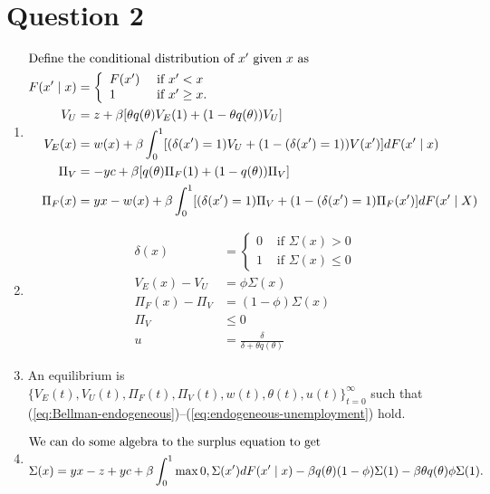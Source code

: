 \documentclass[11pt]{article}
\begin{document}
\section{Question 2}
\label{sec:org5458767}
  \begin{enumerate}
  \item
\begin{align}
\intertext{Define the conditional distribution of $x'$ given $x$ as}
F(x' \mid x) &= \left\{
\begin{array}{ll}
F(x') &\text{ if } x' < x\\
1 &\text{ if } x' \ge x.
\end{array}
\right.\\
V_U &= z + \beta [\theta q(\theta) V_E (1) + (1 - \theta q(\theta)) V_U]\label{eq:Bellman-endogeneous}\\
V_E (x) &= w(x) + \beta \int^1_0 [(\delta (x') = 1) V_U + (1 - (\delta (x') = 1)) V(x')]dF(x' \mid x)\\
\Pi_V &= -yc + \beta [q (\theta) \Pi_F (1) + (1 - q(\theta))\Pi_V]\\
\Pi_F (x) &= yx - w(x) + \beta \int^1_0 [(\delta(x') = 1)\Pi_V + (1 - (\delta(x') = 1)\Pi_F(x')]d F(x' \mid X)
\end{align}
\item
\begin{align}
\delta(x) &= \left\{\begin{array}{ll}0 &\text{ if } \Sigma(x) > 0\\ 1 &\text{ if } \Sigma(x) \le 0 \end{array}\right. \tag{separation rule}\\
V_E(x) - V_U &= \phi \Sigma(x) \tag{worker surplus}\\
\Pi_F(x) - \Pi_V &= (1 - \phi) \Sigma(x) \tag{employer surplus}\\
\Pi_V &\le 0 \tag{free entry}\\
u &= \frac{\delta}{\delta + \theta q(\theta)} \tag{unemployment}\label{eq:endogeneous-unemployment}
\end{align}
\item 
An equilibrium is $\{ V_E(t), V_U(t), \Pi_F(t), \Pi_V(t), w(t), \theta(t), u(t)\}_{t = 0}^\infty$ such that (\ref{eq:Bellman-endogeneous})--(\ref{eq:endogeneous-unemployment}) hold.
\item
\begin{align}
\intertext{We can do some algebra to the surplus equation to get}
\Sigma (x) &= yx - z + yc + \beta \int^1_0 \max{0, \Sigma (x')} dF(x' \mid x) - \beta q(\theta) (1 - \phi) \Sigma (1) - \beta \theta q(\theta) \phi \Sigma (1).\\

\end{align}
\end{enumerate}
\end{document}
